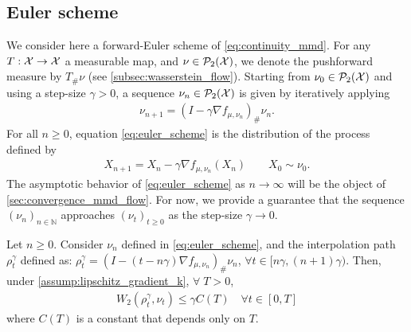 \subsection{Euler scheme}
We consider here a forward-Euler scheme of \cref{eq:continuity_mmd}. For any $T: {{\mathcal X}} \rightarrow {{\mathcal X}}$ a measurable map, and $\nu \in \mathcal{P}_2({{\mathcal X}})$, we denote the pushforward measure by $T_{\#}\nu$ (see \cref{subsec:wasserstein_flow}). Starting from $\nu_0\in \mathcal{P}_2({{\mathcal X}})$ and using a step-size $\gamma>0$, a sequence $\nu_n\in \mathcal{P}_2({{\mathcal X}})$ is given by iteratively applying
\begin{align}\label{eq:euler_scheme}
	\nu_{n+1} = (I - \gamma \nabla f_{\mu,\nu_n})_{\#}\nu_n.
\end{align} 
For all $n\ge 0$, equation \cref{eq:euler_scheme} is the distribution of the process defined by
\begin{align}\label{eq:euler_scheme_particles}
	X_{n+1} = X_n - \gamma \nabla f_{\mu,\nu_n}(X_n) \qquad X_0\sim \nu_0.
\end{align}
The asymptotic behavior of \cref{eq:euler_scheme} as $n\rightarrow \infty$ %
will be the object of \cref{sec:convergence_mmd_flow}. For now, we provide a guarantee that the sequence $(\nu_n)_{n\in \mathbb{N}}$ approaches $(\nu_t)_{t\geq 0}$ as the step-size $\gamma\rightarrow 0$.
\begin{proposition}\label{prop:convergence_euler_scheme}
	Let $n\ge0$. Consider $\nu_n$ defined in \cref{eq:euler_scheme}, and the interpolation path $\rho_t^{\gamma}$ defined as: $\rho_t^{\gamma} = (I-(t- n\gamma) \nabla f_{\mu,\nu_n})_{\#}\nu_n$, $\forall t\in [n\gamma,(n+1)\gamma)$. Then, under \cref{assump:lipschitz_gradient_k},  $\forall \;T>0$,%
	\begin{align}
		W_2(\rho_t^{\gamma},\nu_t)\leq \gamma C(T) \quad \forall t\in [0,T]
	\end{align}
	where $C(T)$ is a constant that depends only on $T$.
\end{proposition} 
